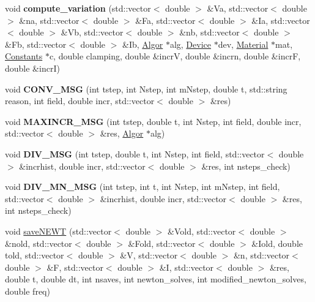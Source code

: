 \begin{DoxyCompactItemize}
\item 
\hypertarget{classNewton_ad8d765453e7d6ae0080524cfaab457fe}{void {\bfseries compute\-\_\-variation} (std\-::vector$<$ double $>$ \&Va, std\-::vector$<$ double $>$ \&na, std\-::vector$<$ double $>$ \&Fa, std\-::vector$<$ double $>$ \&Ia, std\-::vector$<$ double $>$ \&Vb, std\-::vector$<$ double $>$ \&nb, std\-::vector$<$ double $>$ \&Fb, std\-::vector$<$ double $>$ \&Ib, \hyperlink{classAlgor}{Algor} $\ast$alg, \hyperlink{classDevice}{Device} $\ast$dev, \hyperlink{classMaterial}{Material} $\ast$mat, \hyperlink{classConstants}{Constants} $\ast$c, double clamping, double \&incr\-V, double \&incrn, double \&incr\-F, double \&incr\-I)}\label{classNewton_ad8d765453e7d6ae0080524cfaab457fe}

\item 
\hypertarget{classNewton_ab8497a4f82408543b2511c4c35460160}{void {\bfseries C\-O\-N\-V\-\_\-\-M\-S\-G} (int tstep, int Nstep, int m\-Nstep, double t, std\-::string reason, int field, double incr, std\-::vector$<$ double $>$ \&res)}\label{classNewton_ab8497a4f82408543b2511c4c35460160}

\item 
\hypertarget{classNewton_a8f40782d9ec3f752796bb86c54af50c5}{void {\bfseries M\-A\-X\-I\-N\-C\-R\-\_\-\-M\-S\-G} (int tstep, double t, int Nstep, int field, double incr, std\-::vector$<$ double $>$ \&res, \hyperlink{classAlgor}{Algor} $\ast$alg)}\label{classNewton_a8f40782d9ec3f752796bb86c54af50c5}

\item 
\hypertarget{classNewton_aa28303b5d1d4c48de81a5e686e1c35d3}{void {\bfseries D\-I\-V\-\_\-\-M\-S\-G} (int tstep, double t, int Nstep, int field, std\-::vector$<$ double $>$ \&incrhist, double incr, std\-::vector$<$ double $>$ \&res, int nsteps\-\_\-check)}\label{classNewton_aa28303b5d1d4c48de81a5e686e1c35d3}

\item 
\hypertarget{classNewton_a92789e935b9b3168cab20c3d66a1091f}{void {\bfseries D\-I\-V\-\_\-\-M\-N\-\_\-\-M\-S\-G} (int tstep, int t, int Nstep, int m\-Nstep, int field, std\-::vector$<$ double $>$ \&incrhist, double incr, std\-::vector$<$ double $>$ \&res, int nsteps\-\_\-check)}\label{classNewton_a92789e935b9b3168cab20c3d66a1091f}

\item 
\hypertarget{classNewton_a4643f8d440566f11f9bc08375c37ed5b}{void \hyperlink{classNewton_a4643f8d440566f11f9bc08375c37ed5b}{save\-N\-E\-W\-T} (std\-::vector$<$ double $>$ \&Vold, std\-::vector$<$ double $>$ \&nold, std\-::vector$<$ double $>$ \&Fold, std\-::vector$<$ double $>$ \&Iold, double told, std\-::vector$<$ double $>$ \&V, std\-::vector$<$ double $>$ \&n, std\-::vector$<$ double $>$ \&F, std\-::vector$<$ double $>$ \&I, std\-::vector$<$ double $>$ \&res, double t, double dt, int nsaves, int newton\-\_\-solves, int modified\-\_\-newton\-\_\-solves, double freq)}\label{classNewton_a4643f8d440566f11f9bc08375c37ed5b}


\end{DoxyCompactItemize}
